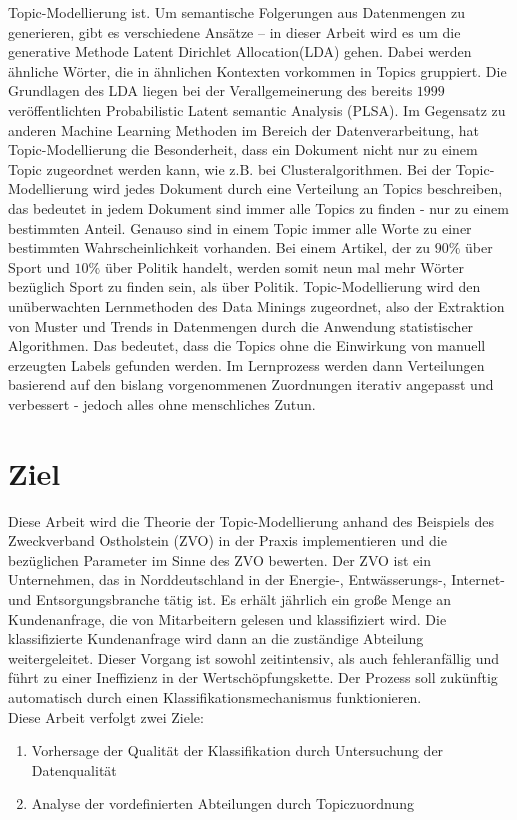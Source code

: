 \documentclass[german,version-2020-11]{uzl-thesis}
\begin{document}
Topic-Modellierung ist. Um semantische Folgerungen aus Datenmengen zu generieren, gibt es verschiedene Ansätze – in dieser Arbeit wird es um die generative Methode Latent Dirichlet Allocation(LDA) gehen. Dabei werden ähnliche Wörter, die in ähnlichen Kontexten vorkommen in Topics gruppiert. Die Grundlagen des LDA liegen bei der Verallgemeinerung des bereits $1999$ veröffentlichten Probabilistic Latent semantic Analysis (PLSA). Im Gegensatz zu anderen Machine Learning Methoden im Bereich der Datenverarbeitung, hat Topic-Modellierung die Besonderheit, dass ein Dokument nicht nur zu einem Topic zugeordnet werden kann, wie z.B. bei Clusteralgorithmen. Bei der Topic-Modellierung wird jedes Dokument durch eine Verteilung an Topics beschreiben, das bedeutet in jedem Dokument sind immer alle Topics zu finden - nur zu einem bestimmten Anteil. Genauso sind in einem Topic immer alle Worte zu einer bestimmten Wahrscheinlichkeit vorhanden. Bei einem Artikel, der zu $90\%$ über Sport und $10\%$ über Politik handelt, werden somit neun mal mehr Wörter bezüglich Sport zu finden sein, als über Politik. Topic-Modellierung wird den unüberwachten Lernmethoden des Data Minings zugeordnet, also der Extraktion von Muster und Trends in Datenmengen durch die Anwendung statistischer Algorithmen. Das bedeutet, dass die Topics ohne die Einwirkung von manuell erzeugten Labels gefunden werden. Im Lernprozess werden dann Verteilungen basierend auf den bislang vorgenommenen Zuordnungen iterativ angepasst und verbessert - jedoch alles ohne menschliches Zutun. 

\section{Ziel}
Diese Arbeit wird die Theorie der Topic-Modellierung anhand des Beispiels des Zweckverband Ostholstein (ZVO) in der Praxis implementieren und die bezüglichen Parameter im Sinne des ZVO bewerten. Der ZVO ist ein Unternehmen, das in Norddeutschland in der Energie-, Entwässerungs-, Internet- und Entsorgungsbranche tätig ist.  Es erhält jährlich ein große Menge an Kundenanfrage, die von Mitarbeitern gelesen und klassifiziert wird. Die klassifizierte Kundenanfrage wird dann an die zuständige Abteilung weitergeleitet. Dieser Vorgang ist sowohl zeitintensiv, als auch fehleranfällig und führt zu einer Ineffizienz in der Wertschöpfungskette. Der Prozess soll zukünftig automatisch durch einen Klassifikationsmechanismus funktionieren. \\
Diese Arbeit verfolgt zwei Ziele: 
\begin{enumerate}
\item Vorhersage der Qualität der Klassifikation durch Untersuchung der Datenqualität
\item Analyse der vordefinierten Abteilungen durch Topiczuordnung
\end{enumerate}
\end{document}

